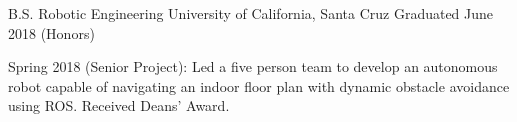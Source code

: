 \begin{cventries}
	\cventry
	{B.S. Robotic Engineering}
	{University of California, Santa Cruz}
	{Graduated June 2018 (Honors)}
	{}
	{
		\begin{cvitems}
			\item Spring 2018 (Senior Project): Led a five person team to develop an autonomous robot capable of
			navigating an indoor floor plan with dynamic obstacle avoidance using ROS. Received Deans' Award.
		\end{cvitems}
	}
\end{cventries}
